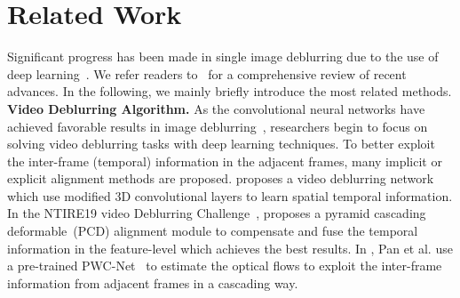 \documentclass[letterpaper]{article} \usepackage{aaai22}  \usepackage{times}  \usepackage{helvet}  \usepackage{courier}  \usepackage[hyphens]{url}  \usepackage{graphicx} \urlstyle{rm} \def\UrlFont{\rm}  \usepackage{natbib}  \usepackage{caption} \DeclareCaptionStyle{ruled}{labelfont=normalfont,labelsep=colon,strut=off} \frenchspacing  \setlength{\pdfpagewidth}{8.5in}  \setlength{\pdfpageheight}{11in}  \newcommand{\hang}{\textcolor[rgb]{0.98,0.5,0.04}}
\begin{document}
\section{Related Work}
Significant progress has been made in single image deblurring due to the use of deep learning~\cite{Gong_2017_CVPR,Nimisha_2017_ICCV,DeblurGAN,Kupyn_2019_ICCV,Zamir2021MPRNet,Chen_2021_CVPR}. We refer readers to~\cite{2021NTIRE, 2020NTIRE, 2019NTIRE} for a comprehensive review of recent advances. In the following, we mainly briefly introduce the most related methods. 
\newline
{\bf Video Deblurring Algorithm.}
As the convolutional neural networks have achieved favorable results in image deblurring~\cite{Gong_2017_CVPR, Zhang2018, Kupyn_2019_ICCV, Zamir2021MPRNet, Chen_2021_CVPR}, researchers begin to focus on solving video deblurring tasks with deep learning techniques.
To better exploit the inter-frame (temporal) information in the adjacent frames, many implicit or explicit alignment methods are proposed.
\cite{2018Adversarial} proposes a video deblurring network which use modified 3D convolutional layers to learn spatial temporal information.
In the NTIRE19 video Deblurring Challenge~\cite{2019NTIRE}, \cite{2019EDVR} proposes a pyramid cascading deformable~(PCD) alignment module to compensate and fuse the temporal information in the feature-level which achieves the best results.
In \cite{Pan_2020_CVPR}, Pan et al. use a pre-trained PWC-Net~\cite{Sun2018PWC-Net} to estimate the optical flows to exploit the inter-frame information from adjacent frames in a cascading way.
\end{document}
